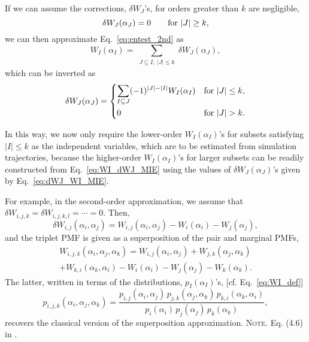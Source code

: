 \documentclass[preprint, superscriptaddress]{revtex4-1}
\newcommand{\note}[1]{{\color{DarkGreen}\footnotesize \textsc{Note.} #1}}
\begin{document}
If we can assume the corrections, $\delta W_J$'s,
for orders greater than $k$ are negligible,
%
\begin{equation}
  \delta W_J(\alpha_J) = 0
  \qquad
  \mbox{for $|J| \ge k$}
  ,
  \notag
\end{equation}
%
we can then approximate Eq.~\eqref{eq:entest_2nd} as
%
\begin{equation}
  W_I(\alpha_I)
  =
  \sum_{ \substack{J \subseteq I, \; |J| \le k} }
  \!\! \delta W_J(\alpha_J)
  ,
  \label{eq:WI_dWJ_MIE}
\end{equation}
%
which can be inverted as
%
\begin{equation}
  \delta W_J(\alpha_J)
  =
  \begin{dcases}
    \sum_{ I \subseteq J }
    (-1)^{|J| - |I|} W_I(\alpha_I)
    &\mbox{for $|J| \le k$}
    ,
    \\
    0
    &\mbox{for $|J| > k$}
    .
  \end{dcases}
  \label{eq:dWJ_WI_MIE}
\end{equation}
%

In this way, we now only require the lower-order $W_I(\alpha_I)$'s
for subsets satisfying $|I| \le k$
as the independent variables,
which are to be estimated from simulation trajectories,
because the higher-order $W_I(\alpha_I)$'s for larger subsets
can be readily constructed from Eq.~\eqref{eq:WI_dWJ_MIE}
using the values of $\delta W_J(\alpha_J)$'s
given by Eq.~\eqref{eq:dWJ_WI_MIE}.

For example,
in the second-order approximation,
we assume that
$\delta W_{i, j, k} = \delta W_{i,j,k, l} = \cdots = 0$.
%
Then,
$$\delta W_{i, j}(\alpha_i, \alpha_j)
= W_{i,j}(\alpha_i, \alpha_j) - W_i(\alpha_i) - W_j(\alpha_j),$$
and the triplet PMF is given as a superposition
of the pair and marginal PMFs,
\begin{align*}
W_{i,j,k}(\alpha_i, \alpha_j, \alpha_k)
=
W_{i,j}(\alpha_i, \alpha_j) + W_{j,k}(\alpha_j, \alpha_k)\\
  + W_{k,i}(\alpha_k, \alpha_i)
  - W_i(\alpha_i) - W_j(\alpha_j) - W_k(\alpha_k)
.
\end{align*}
%
The latter, written in terms of the distributions, $p_I(\alpha_I)$'s,
[cf. Eq.~\eqref{eq:WI_def}]
%
$$
p_{i,j,k}(\alpha_i, \alpha_j, \alpha_k)
=
\frac{ p_{i,j}(\alpha_i, \alpha_j) \, p_{j,k}(\alpha_j, \alpha_k) \, p_{k,i}(\alpha_k, \alpha_i) }{ p_i(\alpha_i) \, p_j(\alpha_j) \, p_k(\alpha_k) }
,
$$
recovers the classical version of the superposition approximation\cite{kirkwood1935, born1946}.
\note{Eq. (4.6) in \cite{born1946}.}
\end{document}
